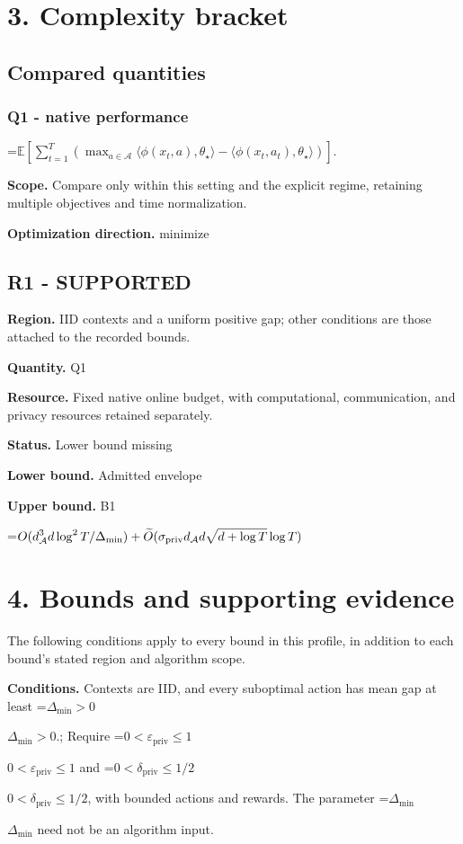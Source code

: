 \documentclass[10pt,a4paper]{article}
\newcommand{\AtlasMath}[1]{\par\begingroup\centering\setbox0=\hbox{$\displaystyle #1$}\ifdim\wd0>1.4\linewidth\typeout{ATLAS WIDE FORMULA: \the\wd0}\fi\ifdim\wd0>\linewidth\resizebox{\linewidth}{!}{\box0}\else\box0\fi\par\endgroup}
\newcommand{\AtlasInlineMath}[1]{\begingroup\setbox0=\hbox{$#1$}\ifdim\wd0>.4\linewidth\endgroup\AtlasMath{#1}\else\endgroup$#1$\fi}
\begin{document}
\section{3. Complexity bracket}
\subsection{Compared quantities}
\subsubsection{Q1 - native performance}
\AtlasMath{\mathbb E\!\left[\sum_{t=1}^{T}\left(\max_{a\in\mathcal A}\langle\phi(x_t,a),\theta_\star\rangle-\langle\phi(x_t,a_t),\theta_\star\rangle\right)\right].}
\textbf{Scope.} Compare only within this setting and the explicit regime, retaining multiple objectives and time normalization.

\textbf{Optimization direction.} minimize

\subsection{R1 - SUPPORTED}
\textbf{Region.} IID contexts and a uniform positive gap; other conditions are those attached to the recorded bounds.

\textbf{Quantity.} Q1

\textbf{Resource.} Fixed native online budget, with computational, communication, and privacy resources retained separately.

\textbf{Status.} Lower bound missing

\textbf{Lower bound.} Admitted envelope

\textbf{Upper bound.} B1

\AtlasMath{O(d_{\mathcal{A}}^3d\log^2T/\Delta_{\min})+\widetilde{O}(\sigma_{\rm priv}d_{\mathcal{A}}d\sqrt{d+\log T}\log T)}
\section{4. Bounds and supporting evidence}
The following conditions apply to every bound in this profile, in addition to each bound's stated region and algorithm scope.

\textbf{Conditions.} Contexts are IID, and every suboptimal action has mean gap at least \AtlasInlineMath{\Delta_{\min}>0}.; Require \AtlasInlineMath{0<\varepsilon_{\mathrm{priv}}\le1} and \AtlasInlineMath{0<\delta_{\mathrm{priv}}\le1/2}, with bounded actions and rewards. The parameter \AtlasInlineMath{\Delta_{\min}} need not be an algorithm input.
\end{document}
